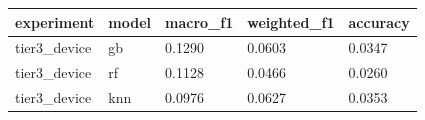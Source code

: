 \begin{tabular}{lllll}
\toprule
  experiment & model & macro\_f1 & weighted\_f1 & accuracy \\
\midrule
tier3\_device &    gb &   0.1290 &      0.0603 &   0.0347 \\
tier3\_device &    rf &   0.1128 &      0.0466 &   0.0260 \\
tier3\_device &   knn &   0.0976 &      0.0627 &   0.0353 \\
\bottomrule
\end{tabular}
